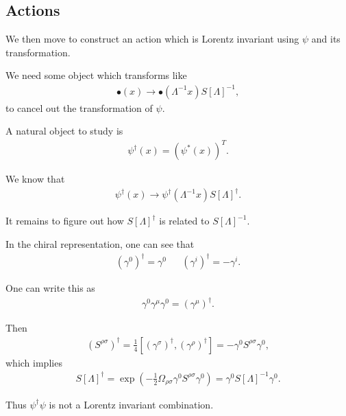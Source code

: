 \subsection{Actions}

We then move to construct an action which is Lorentz invariant using $\psi$ and its transformation.

We need some object which transforms like
\begin{align}
    \bullet\left( x \right)  \to \bullet\left( \Lambda^{-1} x \right)  S \left[ \Lambda \right]^{-1}
,\end{align}
to cancel out the transformation of $\psi$.

A natural object to study is
\begin{align}
    \psi^{\dag} \left( x \right) = \left( \psi^{*}\left( x \right)  \right)^{T}
.\end{align}

We know that
\begin{align}
    \psi^{\dag} \left( x \right) \to \psi^{\dag} \left( \Lambda^{-1} x \right) S \left[ \Lambda \right]^{\dag}
.\end{align}

It remains to figure out how $S\left[ \Lambda \right]^{\dag}$ is related to $S\left[ \Lambda \right]^{-1}$. 

In the chiral representation, one can see that
\begin{align}
    \left( \gamma^{0} \right)^{\dag} = \gamma^{0} && \left( \gamma^{i} \right)^{\dag} = - \gamma^{i}
.\end{align}

One can write this as
\begin{align}
    \gamma^{0} \gamma^{\mu} \gamma^{0} = \left( \gamma^{\mu} \right)^{\dag}
.\end{align}

Then
\begin{align}
    \left( S^{\rho \sigma} \right)^{\dag} = \frac{1}{4} \left[ \left( \gamma^{\sigma} \right)^{\dag} , \left( \gamma^{\rho} \right)^{\dag} \right]  = - \gamma^{0} S^{\rho \sigma} \gamma^{0}
,\end{align}
which implies
\begin{align}
    S \left[ \Lambda \right]^{\dag} = \exp \left( -\frac{1}{2} \Omega_{\rho \sigma} \gamma^{0} S^{\rho \sigma} \gamma^{0} \right) = \gamma^{0} S \left[ \Lambda \right]^{-1} \gamma^{0}
.\end{align}

Thus $\psi^{\dag} \psi$ is not a Lorentz invariant combination.



